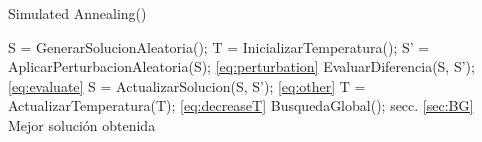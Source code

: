 \begin{algorithm}[t]
  \caption{Simulated Annealing(\mbox{})}
  \label{pseu:sa}
  \begin{algorithmic}[1]
    \STATE S = GenerarSolucionAleatoria();
    \STATE T = InicializarTemperatura(); 
        \STATE S' = AplicarPerturbacionAleatoria(S); \ref{eq:perturbation}
        \STATE EvaluarDiferencia(S, S'); \ref{eq:evaluate} 
        \STATE S = ActualizarSolucion(S, S');  \ref{eq:other}
        \STATE T = ActualizarTemperatura(T); \ref{eq:decreaseT}
        \STATE BusquedaGlobal(); secc. \ref{sec:BG}
    \ENDWHILE
    \RETURN Mejor solución obtenida
  \end{algorithmic}
\end{algorithm}